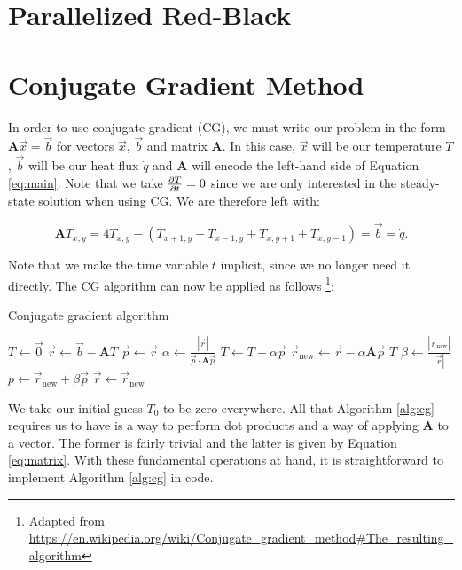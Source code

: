 \documentclass[paper=a4, fontsize=11pt]{scrartcl} %
\numberwithin{equation}{section} %
\numberwithin{figure}{section} %
\numberwithin{table}{section} %
\newcommand{\matr}[1]{\mathbf{#1}}
\begin{document}
\section{Parallelized Red-Black}


\section{Conjugate Gradient Method}

In order to use conjugate gradient (CG), we must write our problem in the form $\matr{A}\vec{x} = \vec{b}$ for vectors $\vec{x}$, $\vec{b}$ and matrix $\matr{A}$. In this case, $\vec{x}$ will be our temperature $T$, $\vec{b}$ will be our heat flux $\dot{q}$ and $\matr{A}$ will encode the left-hand side of Equation \ref{eq:main}. Note that we take ${\partial T \over \partial t} = 0$ since we are only interested in the steady-state solution when using CG. We are therefore left with:

\begin{equation}
	\matr{A}T_{x,y} = 4T_{x,y} - (T_{x+1,y} + T_{x-1,y} + T_{x,y+1} + T_{x,y-1}) = \vec{b} = \dot{q}.
	\label{eq:matrix}
\end{equation}

Note that we make the time variable $t$ implicit, since we no longer need it directly. The CG algorithm can now be applied as follows \footnote{Adapted from \url{https://en.wikipedia.org/wiki/Conjugate_gradient_method#The_resulting_algorithm}}:

\begin{algorithm}[H]
\caption{Conjugate gradient algorithm}
\begin{algorithmic}
	\REQUIRE{$\matr{A}$, $\vec{b}$, $\epsilon$}
	\STATE $T \gets \vec{0}$
	\STATE $\vec{r} \gets \vec{b} - \matr{A}T$  
	\STATE $\vec{p} \gets \vec{r}$
	\LOOP
		\STATE $\alpha \gets \frac{|\vec{r}|}{\vec{p} \cdot \matr{A}\vec{p}}$
		\STATE $T \gets T + \alpha \vec{p}$
		\STATE $\vec{r}_{\mathrm{new}} \gets \vec{r} - \alpha\matr{A}\vec{p}$
			\RETURN $T$
		\ENDIF
		\STATE $\beta \gets \frac{|\vec{r}_{\mathrm{new}}|}{|\vec{r}|}$
		\STATE $p \gets \vec{r}_{\mathrm{new}} + \beta\vec{p}$
		\STATE $\vec{r} \gets \vec{r}_{\mathrm{new}}$
	\ENDLOOP
\end{algorithmic}
\label{alg:cg}
\end{algorithm}

We take our initial guess $T_0$ to be zero everywhere. All that Algorithm \ref{alg:cg} requires us to have is a way to perform dot products and a way of applying $\matr{A}$ to a vector. The former is fairly trivial and the latter is given by Equation \ref{eq:matrix}. With these fundamental operations at hand, it is straightforward to implement Algorithm \ref{alg:cg} in code. \linebreak
\end{document}
